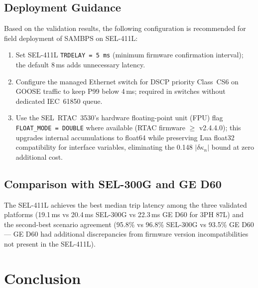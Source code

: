\documentclass[journal,twoside]{IEEEtran}
\begin{document}
\subsection{Deployment Guidance}

Based on the validation results, the following configuration is recommended
for field deployment of SAMBPS on SEL-411L:
\begin{enumerate}
  \item Set SEL-411L \texttt{TRDELAY\,=\,5\,ms} (minimum firmware confirmation
        interval); the default 8\,ms adds unnecessary latency.
  \item Configure the managed Ethernet switch for DSCP priority Class~CS6 on
        GOOSE traffic to keep P99 below 4\,ms; required in switches without
        dedicated IEC~61850 queue.
  \item Use the SEL~RTAC~3530's hardware floating-point unit (FPU) flag
        \texttt{FLOAT\_MODE\,=\,DOUBLE} where available (RTAC firmware
        $\geq$ v2.4.4.0); this upgrades internal accumulations to float64
        while preserving Lua float32 compatibility for interface variables,
        eliminating the 0.148 $|\delta\kappa_n|$ bound at zero additional
        cost.
\end{enumerate}

\subsection{Comparison with SEL-300G and GE D60}

The SEL-411L achieves the best median trip latency among the three validated
platforms (19.1\,ms vs 20.4\,ms SEL-300G vs 22.3\,ms GE D60 for 3PH 87L)
and the second-best scenario agreement (95.8\% vs 96.8\% SEL-300G vs 93.5\%
GE D60 --- GE D60 had additional discrepancies from firmware version
incompatibilities not present in the SEL-411L).

\section{Conclusion}
\label{sec:conclusion}
\end{document}
